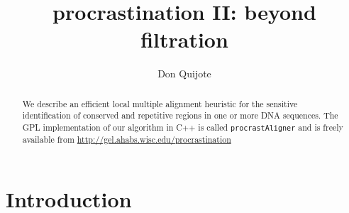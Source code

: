 \documentclass{llncs}
\begin{document}
\renewcommand{\labelenumi}{(\Alph{enumi})}
\renewcommand{\labelenumii}{(\alph{enumii})}

\frontmatter          %
%
\pagestyle{headings}  %

\mainmatter              %
%
\title{procrastination II: beyond filtration}
%
\author{Don Quijote}
%
%


\maketitle


\begin{abstract}
We describe an efficient local multiple alignment
heuristic for the sensitive identification of
conserved and repetitive regions in one or more DNA
sequences.  The GPL implementation of our algorithm in C++ is
called \texttt{procrastAligner} and is freely available from
\url{http://gel.ahabs.wisc.edu/procrastination}
\end{abstract}




\section{ Introduction }
\end{document}
